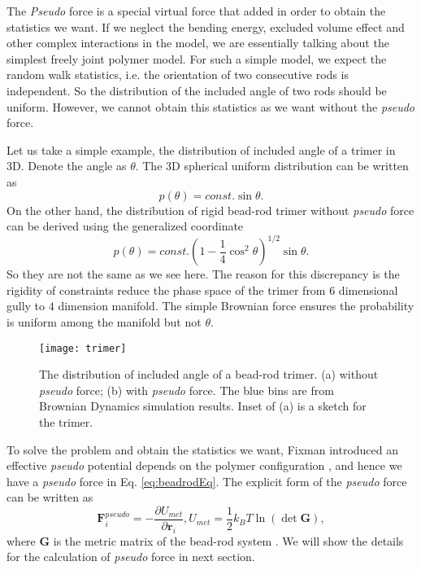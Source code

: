 The \emph{Pseudo} force is a special virtual force that added in order to obtain the statistics we want. If we neglect the bending energy, excluded volume effect and other complex interactions in the model, we are essentially talking about the simplest freely joint polymer model. For such a simple model, we expect the random walk statistics, i.e. the orientation of two consecutive rods is independent. So the distribution of the included angle of two rods should be uniform. However, we cannot obtain this statistics as we want without the \emph{pseudo} force.

Let us take a simple example, the distribution of included angle of a trimer in 3D. Denote the angle as $\theta$. The 3D spherical uniform distribution can be written as
\begin{equation}
    \label{eq:trimerUniform}
    p(\theta) = const. \sin\theta.
\end{equation}
On the other hand, the distribution of rigid bead-rod trimer without \emph{pseudo} force can be derived using the generalized coordinate
\begin{equation}
    \label{eq:trimerRigid}
    p(\theta) = const. (1-\frac{1}{4}\cos^2\theta)^{1/2}\sin\theta.
\end{equation}
So they are not the same as we see here. The reason for this discrepancy is the rigidity of constraints reduce the phase space of the trimer from $6$ dimensional gully to $4$ dimension manifold. The simple Brownian force ensures the probability is uniform among the manifold but not $\theta$. 
\begin{figure}[htpb]
    \centering
    \texttt{[image: trimer]}
    \caption{The distribution of included angle of a bead-rod trimer. (a) without \emph{pseudo} force; (b) with \emph{pseudo} force. The blue bins are from Brownian Dynamics simulation results. Inset of (a) is a sketch for the trimer. }
    \label{fig:trimer}
\end{figure}

To solve the problem and obtain the statistics we want, Fixman introduced an effective \emph{pseudo} potential depends on the polymer configuration \cite{Fixman1974}, and hence we have a \emph{pseudo} force in Eq. \eqref{eq:beadrodEq}. The explicit form of the \emph{pseudo} force can be written as
\begin{subequations}
    \label{eq:pseudoForce}
    \begin{equation}
        \mathbf{F}_i^{pseudo} = -\frac{\partial U_{met}}{\partial\mathbf{r}_i},
    \end{equation}
    \begin{equation}
        U_{met} = \frac{1}{2}k_B T \ln(\det \mathbf{G}),
    \end{equation}
\end{subequations}
where $\mathbf{G}$ is the metric matrix of the bead-rod system \cite{Pasquali2002}. We will show the details for the calculation of \emph{pseudo} force in next section.

